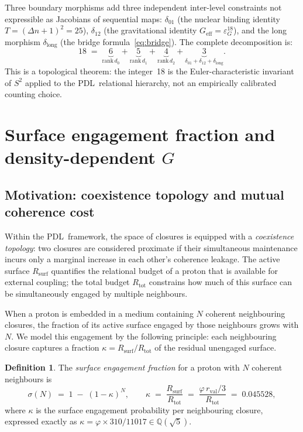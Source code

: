 \documentclass[11pt,a4paper]{article}
\theoremstyle{definition}
\newtheorem{definition}[theorem]{Definition}
\newcommand{\PDL}{\textnormal{PDL}}
\newcommand{\Rsurf}{R_{\mathrm{surf}}}
\newcommand{\Rtot}{R_{\mathrm{tot}}}
\newcommand{\rval}{r_{\mathrm{val}}}
\newcommand{\epsg}{\varepsilon_G}
\newcommand{\rank}{\mathrm{rank}}
\newcommand{\vp}{\varphi}
\newcommand{\Geff}{G_{\mathrm{eff}}}
\newcommand{\kap}{\kappa}
\newcommand{\sig}{\sigma}
\newcommand{\dlong}{\delta_{\mathrm{long}}}
\newcommand{\dmap}[1]{d_{#1}}
\begin{document}
Three boundary morphisms add three independent inter-level constraints not expressible as Jacobians of sequential maps: $\delta_{01}$ (the nuclear binding identity $T = (\Delta n+1)^2 = 25$), $\delta_{12}$ (the gravitational identity $\Geff = \epsg^{18}$), and the long morphism $\dlong$ (the bridge formula~\eqref{eq:bridge}). The complete decomposition is:
\begin{equation}
  \label{eq:18_decomp}
  18 \;=\; \underbrace{6}_{\rank\,\dmap{0}} + \underbrace{5}_{\rank\,\dmap{1}} + \underbrace{4}_{\rank\,\dmap{2}} + \underbrace{3}_{\delta_{01}+\delta_{12}+\dlong}.
\end{equation}
This is a topological theorem: the integer~18 is the Euler-characteristic invariant of $S^2$ applied to the \PDL\ relational hierarchy, not an empirically calibrated counting choice.

\section{Surface engagement fraction and density-dependent \texorpdfstring{$G$}{G}}
\label{sec:sigma}

\subsection{Motivation: coexistence topology and mutual coherence cost}
\label{subsec:coexistence}

Within the \PDL\ framework, the space of closures is equipped with a \emph{coexistence topology}: two closures are considered proximate if their simultaneous maintenance incurs only a marginal increase in each other's coherence leakage.\cite{Topological_Reformulation_PDL_2026} The active surface $\Rsurf$ quantifies the relational budget of a proton that is available for external coupling; the total budget $\Rtot$ constrains how much of this surface can be simultaneously engaged by multiple neighbours.

When a proton is embedded in a medium containing $N$ coherent neighbouring closures, the fraction of its active surface engaged by those neighbours grows with $N$. We model this engagement by the following principle: each neighbouring closure captures a fraction $\kap = \Rsurf/\Rtot$ of the residual unengaged surface.

\begin{definition}
\label{def:sigma}
The \emph{surface engagement fraction} for a proton with $N$ coherent neighbours is
\begin{equation}
  \label{eq:sigma}
  \sig(N) \;=\; 1 \;-\; (1-\kap)^N, \qquad \kap \;=\; \frac{\Rsurf}{\Rtot} \;=\; \frac{\vp\,\rval/3}{\Rtot} \;=\; 0.045528,
\end{equation}
where $\kap$ is the surface engagement probability per neighbouring closure, expressed exactly as $\kap = \vp \times 310/11017 \in \mathbb{Q}(\sqrt{5})$.
\end{definition}
\end{document}
